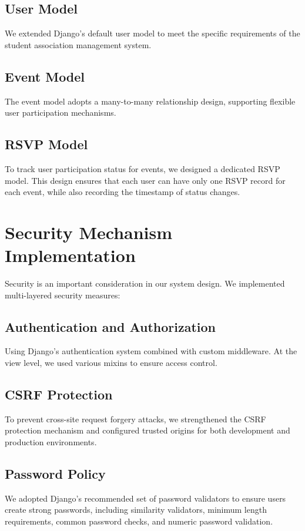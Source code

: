 \subsection{User Model}
We extended Django's default user model to meet the specific requirements of the student association management system.

\subsection{Event Model}
The event model adopts a many-to-many relationship design, supporting flexible user participation mechanisms.

\subsection{RSVP Model}
To track user participation status for events, we designed a dedicated RSVP model. This design ensures that each user can have only one RSVP record for each event, while also recording the timestamp of status changes.

\section{Security Mechanism Implementation}

Security is an important consideration in our system design. We implemented multi-layered security measures:

\subsection{Authentication and Authorization}
Using Django's authentication system combined with custom middleware. At the view level, we used various mixins to ensure access control.

\subsection{CSRF Protection}
To prevent cross-site request forgery attacks, we strengthened the CSRF protection mechanism and configured trusted origins for both development and production environments.

\subsection{Password Policy}
We adopted Django's recommended set of password validators to ensure users create strong passwords, including similarity validators, minimum length requirements, common password checks, and numeric password validation.


